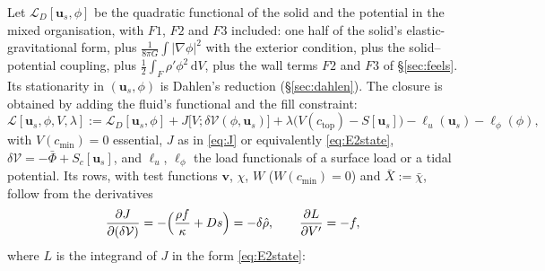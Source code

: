 \documentclass[11pt]{article}
\theoremstyle{definition}
\theoremstyle{remark}
\newcommand{\bu}{\mathbf{u}}
\newcommand{\bv}{\mathbf{v}}
\newcommand{\dV}{\,\mathrm{d}V}
\newcommand{\Vol}{\mathcal V}
\newcommand{\Ltot}{\mathcal L}
\begin{document}
Let $\Ltot_D[\bu_s, \phi]$ be the quadratic functional of the solid and
the potential in the mixed organisation, with $F1$, $F2$ and $F3$
included: one half of the solid's elastic-gravitational form, plus
$\tfrac{1}{8\pi G}\int|\nabla\phi|^2$ with the exterior condition, plus
the solid--potential coupling, plus $\tfrac12\int_F\rho'\phi^2\dV$, plus
the wall terms $F2$ and $F3$ of \S\ref{sec:feels}. Its stationarity in
$(\bu_s, \phi)$ is Dahlen's reduction (\S\ref{sec:dahlen}). The closure
is obtained by adding the fluid's functional and the fill constraint:
\begin{equation}
  \Ltot[\bu_s, \phi, V, \lambda] := \Ltot_D[\bu_s, \phi]
  + J\bigl[V; \delta\Vol(\phi, \bu_s)\bigr]
  + \lambda\bigl(V(c_{\mathrm{top}}) - S[\bu_s]\bigr)
  - \ell_u(\bu_s) - \ell_\phi(\phi),
  \label{eq:Lv}
\end{equation}
with $V(c_{\min}) = 0$ essential, $J$ as in \eqref{eq:J} or
equivalently \eqref{eq:E2state}, $\delta\Vol = -\bar\Phi +
S_c[\bu_s]$, and $\ell_u$, $\ell_\phi$ the load functionals of a surface
load or a tidal potential. Its rows, with test functions $\bv$, $\chi$,
$W$ ($W(c_{\min}) = 0$) and $\bar X := \bar\chi$, follow from the
derivatives
\begin{equation*}
  \frac{\partial J}{\partial(\delta\Vol)}
  = -\Bigl(\frac{\rho f}{\kappa} + Ds\Bigr) = -\delta\hat\rho,
  \qquad
  \frac{\partial L}{\partial V'} = -f ,
\end{equation*}
where $L$ is the integrand of $J$ in the form \eqref{eq:E2state}:
\end{document}
